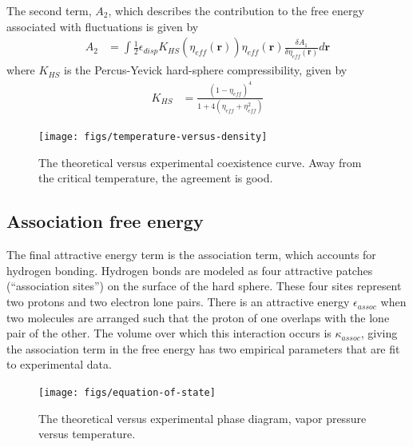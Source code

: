 \documentclass[letterpaper,twocolumn,amsmath,amssymb,prb]{revtex4-1}
\begin{document}
The second term, $A_2$, which describes the contribution to the free
energy associated with fluctuations is given by
\begin{align}
  A_2 &= \int \frac12 \epsilon_\textit{disp}
              K_{HS}(\eta_{\textit{eff}}(\mathbf{r}))
              \eta_{\textit{eff}}(\mathbf{r})
              \frac{\delta A_1}{\delta \eta_\textit{eff}(\mathbf{r})}
                d\mathbf{r}
\end{align}
where $K_{HS}$ is the Percus-Yevick hard-sphere compressibility, given
by
\begin{align}
  K_{HS} &=
    \frac{(1 - \eta_\textit{eff})^4}{1 + 4(\eta_\textit{eff} + \eta_\textit{eff}^2)}
\end{align}

\begin{figure}
\begin{center}
\texttt{[image: figs/temperature-versus-density]}
\end{center}
\caption{The theoretical versus experimental coexistence curve. Away from
the critical temperature, the agreement is good. }
\label{fig:temperature-vs-density}
\end{figure}

\subsection{Association free energy}
The final attractive energy term is the association term, which
accounts for hydrogen bonding.  Hydrogen bonds are modeled as four
attractive patches (``association sites'') on the surface of the hard
sphere.  These four sites represent two protons and two electron lone
pairs.  There is an attractive energy $\epsilon_\textit{assoc}$ when
two molecules are arranged such that the proton of one overlaps
with the lone pair of the other.  The volume over which this
interaction occurs is $\kappa_\textit{assoc}$, giving the association
term in the free energy has two empirical parameters that are fit to
experimental data.

\begin{figure}
\begin{center}
\texttt{[image: figs/equation-of-state]}
\end{center}
\caption{The theoretical versus experimental phase diagram, vapor
  pressure versus temperature.  }
\label{fig:equation-of-state}
\end{figure}
\end{document}
